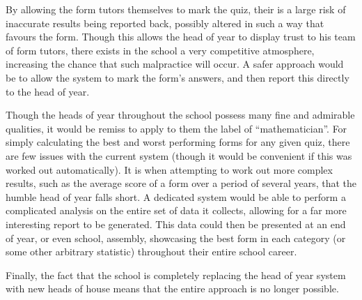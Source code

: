 By allowing the form tutors themselves to mark the quiz, their is a large risk of
inaccurate results being reported back, possibly altered in such a way that favours the form. Though this allows the head of year to display trust to his team of form tutors, there exists in the school a very competitive atmosphere, increasing the chance that such malpractice will occur. A safer approach would be to allow the system to mark the form's answers, and then report this directly to the head of year.

Though the heads of year throughout the school possess many fine and admirable qualities, it would be remiss to apply to them the label of ``mathematician''.  For simply calculating the best and worst performing forms for any given quiz, there are few issues with the current system (though it would be convenient if this was worked out automatically). It is when attempting to work out more complex results, such as the average score of a form over a period of several years, that the humble head of year falls short. A dedicated system would be able to perform a complicated analysis on the entire set of data it collects, allowing for a far more interesting report to be generated. This data could then be presented at an end of year, or even school, assembly, showcasing the best form in each category (or some other arbitrary statistic) throughout their entire school career.

Finally, the fact that the school is completely replacing the head of year system with new heads of house means that the entire approach is no longer possible.
